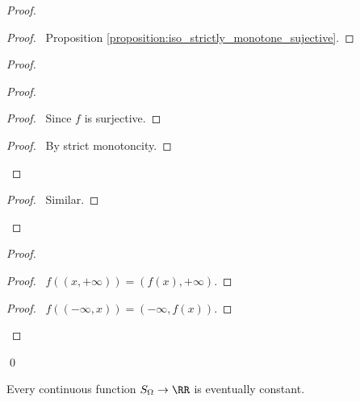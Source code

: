 \begin{proof}
    \pf
    \begin{proof}
        \pf\ Proposition \ref{proposition:iso_strictly_monotone_sujective}.
    \end{proof}
    \begin{proof}
        \begin{proof}
            \begin{proof}
                \pf\ Since $f$ is surjective.
            \end{proof}
            \begin{proof}
                \pf\ By strict monotoncity.
            \end{proof}
        \end{proof}
        \begin{proof}
            \pf\ Similar.
        \end{proof}
    \end{proof}
    \begin{proof}
        \begin{proof}
            \pf\ $f((x, +\infty)) = (f(x), +\infty)$.
        \end{proof}
        \begin{proof}
            \pf\ $f((-\infty, x)) = (-\infty, f(x))$.
        \end{proof}
    \end{proof}
    \qed
\end{proof}

\begin{proposition}
    Every continuous function $S_\Omega \rightarrow \RR$
    is eventually constant.
\end{proposition}

